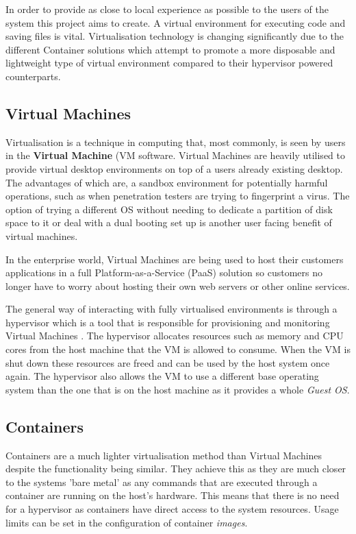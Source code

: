 In order to provide as close to local experience as possible to the users of the system this project aims to create. A virtual environment for executing code and saving files is vital. Virtualisation technology is changing significantly due to the different Container solutions which attempt to promote a more disposable and lightweight type of virtual environment compared to their hypervisor powered counterparts.

\subsection{Virtual Machines}

Virtualisation is a technique in computing that, most commonly, is seen by users in the \textbf{Virtual Machine} (VM software. Virtual Machines are heavily utilised to provide virtual desktop environments on top of a users already existing desktop. The advantages of which are, a sandbox environment for potentially harmful operations, such as when penetration testers are trying to fingerprint a virus. The option of trying a different OS without needing to dedicate a partition of disk space to it or deal with a dual booting set up is another user facing benefit of virtual machines.

In the enterprise world, Virtual Machines are being used to host their customers applications in a full Platform-as-a-Service (PaaS) solution so customers no longer have to worry about hosting their own web servers or other online services.

The general way of interacting with fully virtualised environments is through a hypervisor which is a tool that is responsible for provisioning and monitoring Virtual Machines \cite{hypervisor}. The hypervisor allocates resources such as memory and CPU cores from the host machine that the VM is allowed to consume. When the VM is shut down these resources are freed and can be used by the host system once again. The hypervisor also allows the VM to use a different base operating system than the one that is on the host machine as it provides a whole \textit{Guest OS}.

\subsection{Containers}

Containers are a much lighter virtualisation method than  Virtual Machines despite the functionality being similar. They achieve this as they are much closer to the systems 'bare metal' as any commands that are executed through a container are running on the host's hardware. This means that there is no need for a hypervisor as containers have direct access to the system resources. Usage limits can be set in the configuration of container \textit{images}.

